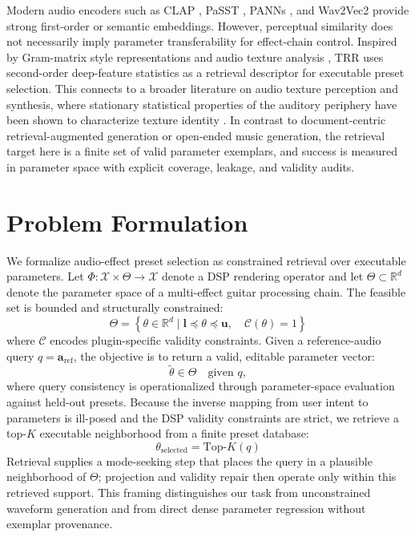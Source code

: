 Modern audio encoders such as CLAP \citep{elizalde2023clap}, PaSST \citep{koutini2022passt}, PANNs \citep{kong2020panns}, and Wav2Vec2 \citep{baevski2020wav2vec} provide strong first-order or semantic embeddings. However, perceptual similarity does not necessarily imply parameter transferability for effect-chain control. Inspired by Gram-matrix style representations \citep{gatys2015style,ulyanov2016audio} and audio texture analysis \citep{stylianou2015audio,mcwec2023texture}, TRR uses second-order deep-feature statistics as a retrieval descriptor for executable preset selection. This connects to a broader literature on audio texture perception and synthesis, where stationary statistical properties of the auditory periphery have been shown to characterize texture identity \citep{mcdermott2011sound}. In contrast to document-centric retrieval-augmented generation \citep{lewis2020rag} or open-ended music generation, the retrieval target here is a finite set of valid parameter exemplars, and success is measured in parameter space with explicit coverage, leakage, and validity audits.

\section{Problem Formulation}
\label{sec:problem_formulation}

We formalize audio-effect preset selection as constrained retrieval over executable parameters. Let $\Phi:\mathcal{X}\times\Theta\rightarrow\mathcal{X}$ denote a DSP rendering operator and let $\Theta\subset\mathbb{R}^{d}$ denote the parameter space of a multi-effect guitar processing chain. The feasible set is bounded and structurally constrained:
\begin{equation}
    \label{eq:feasible_set}
    \Theta = \left\{ \theta \in \mathbb{R}^d \mid \mathbf{l} \preceq \theta \preceq \mathbf{u}, \quad \mathcal{C}(\theta) = 1 \right\}
\end{equation}
where $\mathcal{C}$ encodes plugin-specific validity constraints. Given a reference-audio query $q=\mathbf{a}_{\mathrm{ref}}$, the objective is to return a valid, editable parameter vector:
\begin{equation}
	\tilde{\theta} \in \Theta \quad \text{given } q,
\end{equation}
where query consistency is operationalized through parameter-space evaluation against held-out presets. Because the inverse mapping from user intent to parameters is ill-posed and the DSP validity constraints are strict, we retrieve a top-$K$ executable neighborhood from a finite preset database:
\begin{equation}
	\theta_{\text{selected}} = \text{Top-}K(q)
\end{equation}
Retrieval supplies a mode-seeking step that places the query in a plausible neighborhood of $\Theta$; projection and validity repair then operate only within this retrieved support. This framing distinguishes our task from unconstrained waveform generation and from direct dense parameter regression without exemplar provenance.

